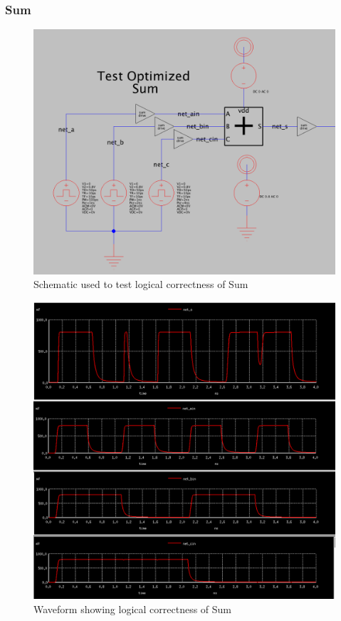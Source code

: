 \documentclass{article}
\begin{document}
\subsubsection{Sum}
\begin{figure}[H]
  \includegraphics[width=\linewidth]{opt_screenshots/test_logic_sum_out_sch.png}
  \caption{Schematic used to test logical correctness of Sum}
  \label{fig:test_logic_sum_out_sch}
\end{figure}

\begin{figure}[H]
  \includegraphics[width=\linewidth]{opt_screenshots/test_logic_sum_out.png}
  \caption{Waveform showing logical correctness of Sum}
  \label{fig:test_logic_sum_out}
\end{figure}
\end{document}
